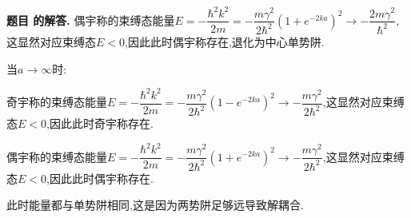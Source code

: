 \documentclass[12pt, a4paper, oneside]{ctexart}
\newcounter{problemname}
\newenvironment{solution}
  {\par\noindent\textbf{题目 \theproblemname 的解答. }}
  {\par}
\begin{document}
\begin{solution}
  偶宇称的束缚态能量$E=-\dfrac{\hbar^2k^2}{2m}=-\dfrac{m\gamma^2}{2\hbar^2}(1+e^{-2ka})^2 \to -\dfrac{2m\gamma^2}{\hbar^2}$,这显然对应束缚态$E<0$,因此此时偶宇称存在,退化为中心单势阱.

  当$a \to \infty$时:

  奇宇称的束缚态能量$E=-\dfrac{\hbar^2k^2}{2m}=-\dfrac{m\gamma^2}{2\hbar^2}(1-e^{-2ka})^2 \to -\dfrac{m\gamma^2}{2\hbar^2}$,这显然对应束缚态$E<0$,因此此时奇宇称存在.

  偶宇称的束缚态能量$E=-\dfrac{\hbar^2k^2}{2m}=-\dfrac{m\gamma^2}{2\hbar^2}(1+e^{-2ka})^2 \to -\dfrac{m\gamma^2}{2\hbar^2}$,这显然对应束缚态$E<0$,因此此时偶宇称存在.

  此时能量都与单势阱相同,这是因为两势阱足够远导致解耦合.
\end{solution}
\end{document}
